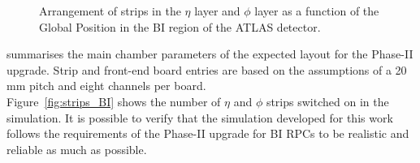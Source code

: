 \begin{figure}[!h]
	\centering	
	\caption{Arrangement of strips in the  $\eta$ layer and  $\phi$ layer as a function of the Global Position in the BI region of the ATLAS detector.}
	\label{fig:Nstrips}
\end{figure}	
\newpage
\noindent {} summarises the main chamber parameters of the expected layout 
for the Phase-II upgrade. Strip and front-end board 
entries are based on the assumptions of a 20 mm pitch and eight channels per board.\\
Figure~\ref{fig:strips_BI} shows the number of $\eta$ and $\phi$ strips switched on in the 
simulation. It is possible to verify that the simulation developed for this work follows the requirements of the Phase-II upgrade for BI RPCs to be realistic and reliable as much as possible.
